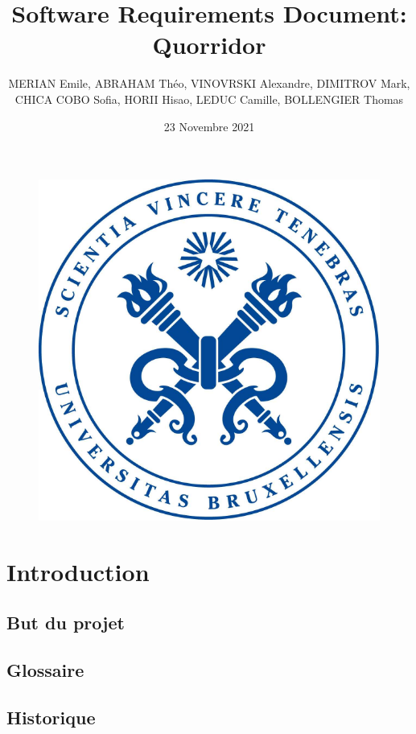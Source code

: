 \documentclass[utf8]{article}
\title{Software Requirements Document: \\ Quorridor}
\author{MERIAN Emile, ABRAHAM Théo, VINOVRSKI Alexandre, DIMITROV Mark,\\ CHICA COBO Sofia,
HORII Hisao, LEDUC Camille, BOLLENGIER Thomas}
\date{23 Novembre 2021}
\begin{document}
\maketitle

\begin{figure}[H]
  \centering
  \includegraphics[scale=0.4]{img/logo.png}
\end{figure}

\newpage
\tableofcontents

\newpage

\section{Introduction}
  \subsection{But du projet}
  \subsection{Glossaire}
  \subsection{Historique}
\end{document}
